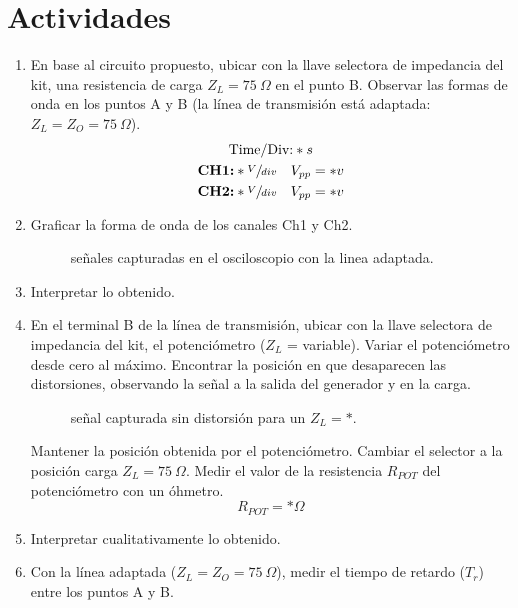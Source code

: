   \section{Actividades}
    \begin{enumerate}
      \item En base al circuito propuesto, ubicar con la llave selectora de impedancia del kit, una resistencia de carga
        $Z_L = 75 \ \Omega$ en el punto B. Observar las formas de onda en los puntos A y B (la línea de transmisión está
        adaptada: $Z_L = Z_O = 75 \ \Omega$).
        \begin{gather*}
          \text{Time/Div:} *s \\
          \text{\textbf{CH1:}} *\sfrac{V}{div} \quad V_{pp} = *v \\
          \text{\textbf{CH2:}} *\sfrac{V}{div} \quad V_{pp} = *v
        \end{gather*}
      \item Graficar la forma de onda de los canales Ch1 y Ch2.
        \begin{figure}[!ht]
          \centering
          \caption{señales capturadas en el osciloscopio con la linea adaptada.}
          \label{fig:sig_plot1}
        \end{figure}
      \item Interpretar lo obtenido.
      \item En el terminal B de la línea de transmisión, ubicar con la llave selectora de impedancia del kit, el
        potenciómetro ($Z_L$ = variable). Variar el potenciómetro desde cero al máximo. Encontrar la posición en que
        desaparecen las distorsiones, observando la señal a la salida del generador y en la carga.
        \begin{figure}[!ht]
          \centering
          \caption{señal capturada sin distorsión para un $Z_L = *$.}
          \label{fig:sig_plot2}
        \end{figure}
        Mantener la posición obtenida por el potenciómetro. Cambiar el selector a la posición carga $Z_L = 75 \ \Omega$.
        Medir el valor de la resistencia $R_{POT}$ del potenciómetro con un óhmetro.
        \begin{equation*}
          R_{POT} = *\Omega
        \end{equation*}
      \item Interpretar cualitativamente lo obtenido.
      \item Con la línea adaptada ($Z_L = Z_O = 75 \ \Omega$), medir el tiempo de retardo ($T_r$) entre los puntos A y B.

\end{enumerate}
